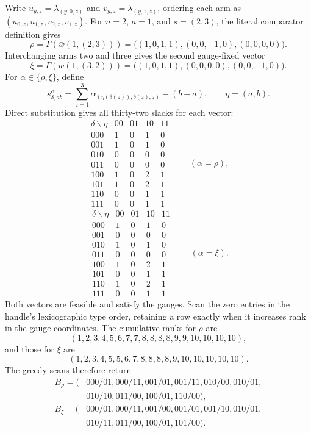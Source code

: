 Write \(u_{y,z}=\lambda_{(y,0,z)}\) and \(v_{y,z}=\lambda_{(y,1,z)}\), ordering each arm as \((u_{0,z},u_{1,z},v_{0,z},v_{1,z})\). For \(n=2\), \(a=1\), and \(s=(2,3)\), the literal comparator definition gives
\[\rho=\Gamma(\bar w(1,(2,3)))=\bigl((1,0,1,1),(0,0,-1,0),(0,0,0,0)\bigr).\]
Interchanging arms two and three gives the second gauge-fixed vector
\[\xi=\Gamma(\bar w(1,(3,2)))=\bigl((1,0,1,1),(0,0,0,0),(0,0,-1,0)\bigr).\]
For \(\alpha\in\{\rho,\xi\}\), define
\[s^\alpha_{\delta,ab}=\sum_{z=1}^3\alpha_{(\eta(\delta(z)),\delta(z),z)}-(b-a),\qquad \eta=(a,b).\]
Direct substitution gives all thirty-two slacks for each vector:
\[\begin{array}{c|rrrr}\delta\backslash\eta&00&01&10&11\\ \hline 000&1&0&1&0\\ 001&1&0&1&0\\ 010&0&0&0&0\\ 011&0&0&0&0\\ 100&1&0&2&1\\ 101&1&0&2&1\\ 110&0&0&1&1\\ 111&0&0&1&1\end{array}\qquad(\alpha=\rho),\]
\[\begin{array}{c|rrrr}\delta\backslash\eta&00&01&10&11\\ \hline 000&1&0&1&0\\ 001&0&0&0&0\\ 010&1&0&1&0\\ 011&0&0&0&0\\ 100&1&0&2&1\\ 101&0&0&1&1\\ 110&1&0&2&1\\ 111&0&0&1&1\end{array}\qquad(\alpha=\xi).\]
Both vectors are feasible and satisfy the gauges. Scan the zero entries in the handle's lexicographic type order, retaining a row exactly when it increases rank in the gauge coordinates. The cumulative ranks for \(\rho\) are
\[(1,2,3,4,5,6,7,7,8,8,8,8,9,9,10,10,10,10),\]
and those for \(\xi\) are
\[(1,2,3,4,5,5,6,7,8,8,8,8,9,10,10,10,10,10).\]
The greedy scans therefore return
\[\begin{aligned}B_\rho=(&000/01,000/11,001/01,001/11,010/00,010/01,\\&010/10,011/00,100/01,110/00),\\ B_\xi=(&000/01,000/11,001/00,001/01,001/10,010/01,\\&010/11,011/00,100/01,101/00).\end{aligned}\]
